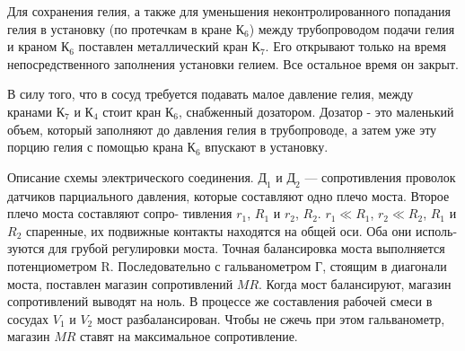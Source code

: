 \documentclass[a4paper, 12pt]{article}%
\begin{document}
Для сохранения гелия, а также для уменьшения неконтролированного попадания гелия в установку (по протечкам в кране $К_6$) между
трубопроводом подачи гелия и краном $К_6$ поставлен металлический
кран $К_7$. Его открывают только на время непосредственного заполнения установки гелием. Все остальное время он закрыт.

В силу того, что в сосуд требуется подавать малое давление гелия,
между кранами $К_7$ и $К_4$ стоит кран $К_6$, снабженный дозатором. Дозатор - это маленький объем, который заполняют до давления гелия в трубопроводе, а затем уже эту порцию гелия с помощью крана $К_6$ впускают в установку.

Описание схемы электрического соединения. $Д_1$ и $Д_2$ — сопротивления проволок датчиков парциального давления, которые составляют одно плечо моста. Второе плечо моста составляют сопро- тивления $r_1$, $R_1$ и $r_2$, $R_2$. $r_1 \ll R_1$, $r_2 \ll R_2$, $R_1$ и $R_2$ спаренные, их подвижные контакты находятся на общей оси. Оба они исполь- зуются для грубой регулировки моста. Точная балансировка моста выполняется потенциометром R. Последовательно с гальванометром $Г$, стоящим в диагонали моста, поставлен магазин сопротивлений $MR$. Когда мост балансируют, магазин сопротивлений выводят на ноль. В процессе же составления рабочей смеси в сосудах $V_1$ и $V_2$ мост разбалансирован. Чтобы не сжечь при этом гальванометр, магазин $MR$ ставят на максимальное сопротивление.
\end{document}
